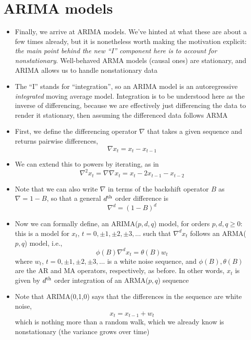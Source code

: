 \documentclass{article}
\begin{document}
\section{ARIMA models}

\begin{itemize}
\item Finally, we arrive at ARIMA models. We've hinted at what these are about a
  few times already, but it is nonetheless worth making the motivation explicit:
  \emph{the main point behind the new ``I'' component here is to account for
    nonstationary}. Well-behaved ARMA models (causal ones) are stationary, and
  ARIMA allows us to handle nonstationary data   

\item The ``I'' stands for ``integration'', so an ARIMA model is an
  autoregressive \emph{integrated} moving average model. Integration is to be
  understood here as the inverse of differencing, because we are effectively
  just differencing the data to render it stationary, then assuming the
  differenced data follows ARMA  

\item First, we define the differencing operator $\nabla$ that takes a given
  sequence and returns pairwise differences,  
  \[
  \nabla x_t = x_t - x_{t-1}
  \]

\item We can extend this to powers by iterating, as in 
  \[
  \nabla^2 x_t = \nabla \nabla x_t = x_t - 2 x_{t-1} - x_{t-2}
  \]

\item Note that we can also write $\nabla$ in terms of the backshift operator
  $B$ as $\nabla = 1 - B$, so that a general $d^{\textnormal{th}}$ order difference is
  \[
  \nabla^d = (1-B)^d 
  \]

\item Now we can formally define, an ARIMA($p,d,q$) model, for orders $p,d,q  
  \geq 0$: this is a model for $x_t$, $t = 0, \pm 1, \pm 2, \pm 3, \dots$ such
  that $\nabla^d x_t$ follows an ARMA($p,q$) model, i.e., 
  \begin{equation}
  \label{eq:arima-pdq}
  \phi(B) \nabla^d x_t = \theta(B) w_t
  \end{equation}
  where $w_t$, $t = 0, \pm 1, \pm 2, \pm 3, \dots$ is a white noise sequence,
  and $\phi(B),\theta(B)$ are the AR and MA operators, respectively, as before. 
  In other words, $x_t$ is given by $d^{\textnormal{th}}$ order integration of an ARMA($p,q$)
  sequence 

\item Note that ARIMA(0,1,0) says that the differences in the sequence are white
  noise, 
  \[
  x_t = x_{t-1} + w_t
  \]
  which is nothing more than a random walk, which we already know is
  nonstationary (the variance grows over time)


\end{itemize}
\end{document}
